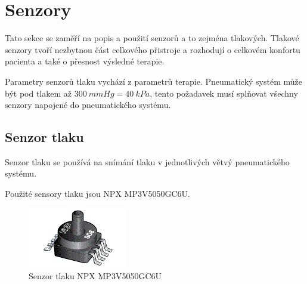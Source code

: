 \section{Senzory}
Tato sekce se zaměří na popis a použití senzorů a to zejména tlakových. Tlakové senzory tvoří nezbytnou část celkového přistroje a rozhodují o celkovém konfortu pacienta a také o přesnost výsledné terapie. \par
Parametry senzorů tlaku vychází z parametrů terapie. Pneumatický systém může být pod tlakem až $300 \ mmHg = 40 \ kPa$, tento požadavek musí splňovat všechny senzory napojené do pneumatického systému.

\subsection{Senzor tlaku} \label{section:pressure_sen}
Senzor tlaku se používá na snímání tlaku v jednotlivých větvý pneumatického systému. \par


Použité sensory tlaku jsou NPX MP3V5050GC6U.

\begin{figure}[H]
    \centering
    \includegraphics[width=0.5\linewidth]{pictures/nxp_sensor.jpg}
    \caption{Senzor tlaku NPX MP3V5050GC6U}
    \label{fig:nxp}
\end{figure}

